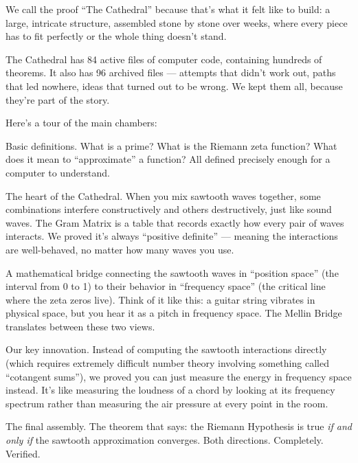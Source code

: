 \documentclass[12pt,a4paper]{article}
\begin{document}
We call the proof ``The Cathedral'' because that's what it felt like to
build: a large, intricate structure, assembled stone by stone over weeks,
where every piece has to fit perfectly or the whole thing doesn't stand.

The Cathedral has 84 active files of computer code, containing hundreds
of theorems. It also has 96 archived files --- attempts that didn't work
out, paths that led nowhere, ideas that turned out to be wrong. We
kept them all, because they're part of the story.

Here's a tour of the main chambers:

\begin{description}[leftmargin=2cm, labelwidth=1.8cm]
  \item[The Foundation] Basic definitions. What is a prime? What is the
    Riemann zeta function? What does it mean to ``approximate'' a
    function? All defined precisely enough for a computer to understand.

  \item[The Gram Matrix] The heart of the Cathedral. When you mix
    sawtooth waves together, some combinations interfere constructively
    and others destructively, just like sound waves. The Gram Matrix
    is a table that records exactly how every pair of waves interacts.
    We proved it's always ``positive definite'' --- meaning the
    interactions are well-behaved, no matter how many waves you use.

  \item[The Mellin Bridge] A mathematical bridge connecting the
    sawtooth waves in ``position space'' (the interval from 0 to 1) to
    their behavior in ``frequency space'' (the critical line where the
    zeta zeros live). Think of it like this: a guitar string vibrates
    in physical space, but you hear it as a pitch in frequency space.
    The Mellin Bridge translates between these two views.

  \item[The Parseval Bridge] Our key innovation. Instead of computing
    the sawtooth interactions directly (which requires extremely
    difficult number theory involving something called ``cotangent
    sums''), we proved you can just measure the energy in frequency
    space instead. It's like measuring the loudness of a chord by
    looking at its frequency spectrum rather than measuring the air
    pressure at every point in the room.

  \item[The Crown] The final assembly. The theorem that says: the
    Riemann Hypothesis is true \emph{if and only if} the sawtooth
    approximation converges. Both directions. Completely. Verified.
\end{description}
\end{document}

